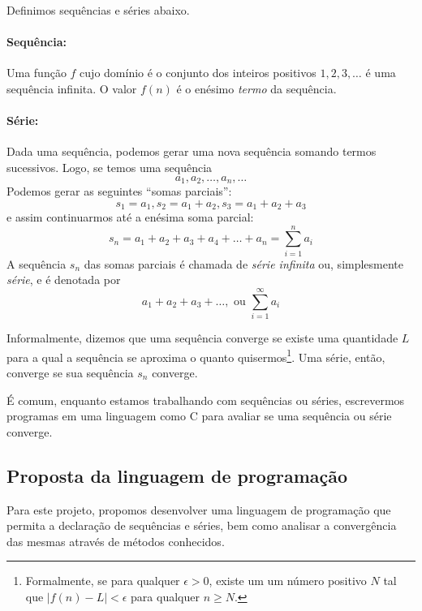 \documentclass[a4 paper, 12pt]{article}
\begin{document}
Definimos sequ\^encias e s\'eries abaixo.

\paragraph{Sequ\^encia:} Uma fun\c c\~ao $f$ cujo dom\'inio \'e o
conjunto dos inteiros positivos $1, 2, 3, \ldots$ \'e uma sequ\^encia
infinita. O valor $f(n)$ \'e o en\'esimo \emph{termo} da sequ\^encia.

\paragraph{S\'erie:} Dada uma sequ\^encia, podemos gerar uma nova
sequ\^encia somando termos sucessivos. Logo, se temos uma sequ\^encia
\begin{equation}
  a_1, a_2, \ldots, a_n, \ldots
\end{equation}
Podemos gerar as seguintes ``somas parciais'':
\begin{equation}
  s_1 = a_1, s_2 = a_1 + a_2,  s_3 = a_1 + a_2 + a_3
\end{equation}
e assim continuarmos at\'e a en\'esima soma parcial:
\begin{equation}
  s_n = a_1 + a_2 + a_3 + a_4 + \ldots + a_n = \sum_{i = 1}^{n}a_i
\end{equation}
A sequ\^encia ${s_n}$ das somas parciais \'e chamada de \emph{s\'erie
  infinita} ou, simplesmente \emph{s\'erie}, e \'e denotada por
\begin{equation}
  a_1 + a_2 + a_3 + \ldots, \textrm{  ou  } \sum_{i = 1}^{\infty}a_i
\end{equation}

Informalmente, dizemos que uma sequ\^encia converge se existe uma
quantidade $L$ para a qual a sequ\^encia se aproxima o quanto
quisermos\footnote{Formalmente, se para qualquer $\epsilon > 0$,
  existe um um n\'umero positivo $N$ tal que $|f(n) - L| < \epsilon$
  para qualquer $n \geq N$.}. Uma s\'erie, ent\~ao, converge se sua
sequ\^encia ${s_n}$ converge.

\'E comum, enquanto estamos trabalhando com sequ\^encias ou s\'eries,
escrevermos programas em uma linguagem como C para avaliar se uma
sequ\^encia ou s\'erie converge.

\subsection{Proposta da linguagem de programa\c c\~ao}
Para este projeto, propomos desenvolver uma linguagem de programa\c
c\~ao que permita a declara\c c\~ao de sequ\^encias e s\'eries, bem
como analisar a converg\^encia das mesmas atrav\'es de m\'etodos
conhecidos.
\end{document}
